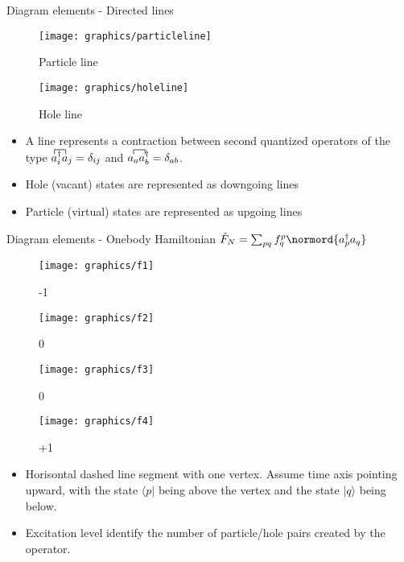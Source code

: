\documentclass[compress]{beamer}
\newcommand*{\cre}[1]{a^{\dagger}_{#1}}
\newcommand*{\an}[1]{a_{#1}}
\begin{document}
\begin{frame}{Diagram elements - Directed lines}
    \begin{figure}
    \centering
        \parbox{0.35\textwidth}{
            \centering
            \texttt{[image: graphics/particleline]}
            \caption{Particle line}
        } \qquad
        \parbox{0.35\textwidth}{
            \centering
            \texttt{[image: graphics/holeline]}
            \caption{Hole line}
        }
    \end{figure}

    \begin{itemize}
        \item A line represents a contraction between second quantized operators of the 
type $ \contraction{}{a}{{}^{\dagger}_i}{a}
    a^\dagger_i a_j=\delta_{ij}$ and  $\contraction{}{\an{a}}{}{\cre{b}}
\an{a}\cre{b}=\delta_{ab}$. 
        \item Hole (vacant) states are represented as downgoing lines 
        \item Particle (virtual) states are represented as upgoing lines
    \end{itemize}

\end{frame}
\begin{frame}{Diagram elements - Onebody Hamiltonian $\hat{F}_N =\sum_{pq} f_q^p \normord{a^\dagger_p a_q}$}
    \renewcommand{\figurename}{Level}
    \begin{figure}
    \centering
    \parbox{0.20\textwidth}{
            \centering
            \texttt{[image: graphics/f1]}
            \caption{-1}
        }
        \parbox{0.20\textwidth}{
            \centering
            \texttt{[image: graphics/f2]}
            \caption{0}
        }
        \parbox{0.20\textwidth}{
            \centering
            \texttt{[image: graphics/f3]}
            \caption{0}
        }
        \parbox{0.20\textwidth}{
            \centering
            \texttt{[image: graphics/f4]}
            \caption{+1}
        }
    \end{figure}

    \begin{itemize}
        \item Horisontal dashed line segment with one vertex. Assume time axis pointing upward, with 
the state $\langle p|$ being above the vertex and the state $|q\rangle$ being below. 
        \item Excitation level identify the number of particle/hole pairs created by the operator.
    \end{itemize}
\end{frame}
\end{document}
